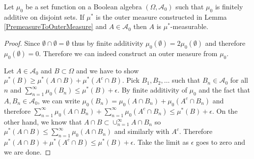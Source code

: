 \begin{lem}\label{PremeasureBooleanAlgebraOuterMeasurable}Let $\mu_0$  be a set function on a Boolean algebra $(\Omega,
  \mathcal{A}_0)$ such that $\mu_0$ is finitely additive on disjoint sets.  If $\mu^*$ is the outer measure  constructed in Lemma
  \ref{PremeasureToOuterMeasure} and $A \in \mathcal{A}_0$ then $A$ is
  $\mu^*$-measurable.
\end{lem}
\begin{proof}
Since $\emptyset \cap \emptyset = \emptyset$ thus by finite additivity $\mu_0(\emptyset) = 2 \mu_0(\emptyset)$ and
therefore $\mu_0(\emptyset) = 0$.   Therefore we can indeed construct an outer measure from $\mu_0$.

Let $A \in \mathcal{A}_0$ and $B \subset \Omega$ and we have to show
$\mu^*(B) \geq \mu^*(A \cap B) + \mu^*(A^c \cap B)$. 
Pick $B_1, B_2, \dotsc$ such that $B_n \in \mathcal{A}_0$ for all $n$
and $\sum_{n=1}^\infty \mu_0(B_n) \leq \mu^*(B) + \epsilon$.  By
finite additivity of $\mu_0$ and the fact that $A, B_n \in \mathcal{A}_0$,
we can write $\mu_0 (B_n) = \mu_0(A \cap B_n) + \mu_0(A^c \cap B_n)$
and therefore $\sum_{n=1}^\infty \mu_0(A \cap B_n) + \sum_{n=1}^\infty
\mu_0(A^c \cap B_n) \leq \mu^*(B) + \epsilon$.  On the other hand, we
know that $A \cap B \subset \cup_{n=1}^\infty A \cap B_n$ so $\mu^*(A
\cap B) \leq \sum_{n=1}^\infty \mu_0( A \cap B_n)$ and similarly with
$A^c$.  Therefore $\mu^*(A \cap B) + \mu^*(A^c \cap B)\leq \mu^*(B) + \epsilon$.
Take the limit as $\epsilon$ goes to zero and we are done.
\end{proof}

